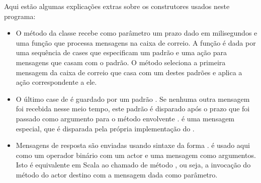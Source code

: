 Aqui est\~{a}o algumas explica\c{c}\~{o}es extras sobre os construtores usados neste programa:
\begin{itemize}
\item
O m\'{e}todo  da classe  recebe como par\^{a}metro um prazo dado
em milisegundos e uma fun\c{c}\~{a}o que processa mensagens na caixa de correio. A fun\c{c}\~{a}o \'{e} dada
por uma sequ\^{e}ncia de cases que especificam um padr\~{a}o e uma a\c{c}\~{a}o para mensagens que 
casam com o padr\~{a}o. O m\'{e}todo  seleciona a primeira mensagem da 
caixa de correio que casa com um destes padr\~{o}es e aplica a a\c{c}\~{a}o correspondente a ele. 


\item
O \'{u}ltimo case de  \'{e} guardado por um padr\~{a}o .  
Se nenhuma outra mensagem foi recebida nesse meio tempo, este padr\~{a}o \'{e} disparado
ap\'{o}s o prazo que foi passado como argumento para o m\'{e}todo envolvente .
 \'{e} uma mensagem especial, que \'{e} disparada pela pr\'{o}pria implementa\c{c}\~{a}o do 
.    

\item
Mensagens de resposta s\~{a}o enviadas usando sintaxe da forma .
\code{!} \'{e} usado aqui como um operador bin\'{a}rio com um actor e uma mensagem como argumentos.
Isto \'{e} equivalente em Scala ao chamado de m\'{e}todo , ou seja, 
a invoca\c{c}\~{a}o do m\'{e}todo \code{!} do actor destino com a mensagem dada como par\^{a}metro.
\end{itemize}    

